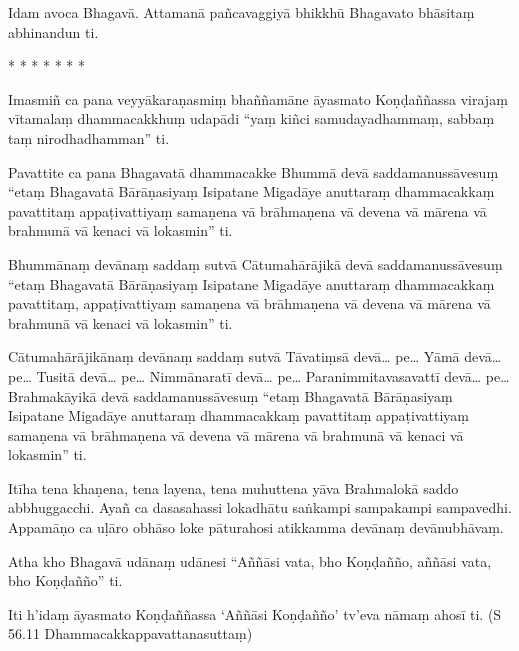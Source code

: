 Idam avoca Bhagavā. Attamanā pañcavaggiyā bhikkhū Bhagavato bhāsitaṃ abhinandun ti.

\begin{center}
    * * * * * * *
\end{center}

Imasmiñ ca pana veyyākaraṇasmiṃ bhaññamāne āyasmato Koṇḍaññassa virajaṃ vītamalaṃ dhammacakkhuṃ udapādi “yaṃ kiñci samudayadhammaṃ, sabbaṃ taṃ nirodhadhamman” ti.

Pavattite ca pana Bhagavatā dhammacakke Bhummā devā saddamanussāvesuṃ “etaṃ Bhagavatā Bārāṇasiyaṃ Isipatane Migadāye anuttaraṃ dhammacakkaṃ pavattitaṃ appaṭivattiyaṃ samaṇena vā brāhmaṇena vā devena vā mārena vā brahmunā vā kenaci vā lokasmin” ti.

Bhummānaṃ devānaṃ saddaṃ sutvā Cātumahārājikā devā saddamanussāvesuṃ “etaṃ Bhagavatā Bārāṇasiyaṃ Isipatane Migadāye anuttaraṃ dhammacakkaṃ pavattitaṃ, appaṭivattiyaṃ samaṇena vā brāhmaṇena vā devena vā mārena vā brahmunā vā kenaci vā lokasmin” ti.

Cātumahārājikānaṃ devānaṃ saddaṃ sutvā Tāvatiṃsā devā… pe… Yāmā devā… pe… Tusitā devā… pe… Nimmānaratī devā… pe… Paranimmitavasavattī devā… pe… Brahmakāyikā devā saddamanussāvesuṃ “etaṃ Bhagavatā Bārāṇasiyaṃ Isipatane Migadāye anuttaraṃ dhammacakkaṃ pavattitaṃ appaṭivattiyaṃ samaṇena vā brāhmaṇena vā devena vā mārena vā brahmunā vā kenaci vā lokasmin” ti.

Itīha tena khaṇena, tena layena‚ tena muhuttena yāva Brahmalokā saddo abbhuggacchi. Ayañ ca dasasahassi lokadhātu saṅkampi sampakampi sampavedhi. Appamāṇo ca uḷāro obhāso loke pāturahosi atikkamma devānaṃ devānubhāvaṃ.

Atha kho Bhagavā udānaṃ udānesi “Aññāsi vata, bho Koṇḍañño, aññāsi vata, bho Koṇḍañño” ti.

Iti h’idaṃ āyasmato Koṇḍaññassa ‘Aññāsi Koṇḍañño’ tv’eva nāmaṃ ahosī ti. (S 56.11 Dhammacakkappavattanasuttaṃ)